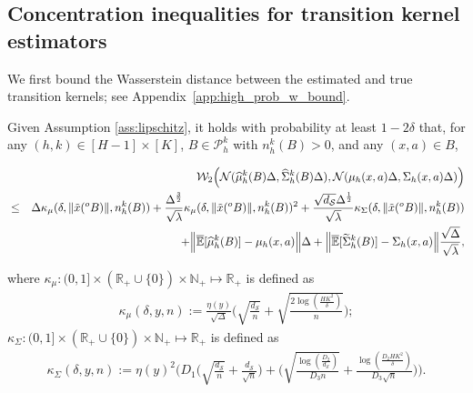 \documentclass[final,supplement]{siamart251216}
\newcommand{\NN}{\mathcal{N}}
\begin{document}
\subsection{Concentration inequalities for transition kernel estimators}
We first bound the Wasserstein distance between the estimated and true transition kernels; see Appendix~\ref{app:high_prob_w_bound}.
\begin{theorem}\label{thm:high_prob_w_bound} Given Assumption \ref{ass:lipschitz}, it holds with probability at least $1-2\delta$ that, for any $ (h,k) \in [H-1]\times [K]$, $B \in \mathcal{P}_h^k$ with $n_h^k(B)>0$, and any $(x,a) \in B$,  

    \begin{eqnarray}
&&\mathcal{W}_{2}\Big(\NN(\widehat{\mu}_{h}^{k}(B)\Delta,\widehat{\Sigma}_{h}^{k}(B)\Delta),\NN(\mu_{h}(x,a)\Delta,\Sigma_{h}(x,a)\Delta)\Big) \nonumber\\
    &\leq& \Delta\kappa_{\mu}(\delta,\|\tilde{x}(^{o}B)\|,n_h^k(B))+ \frac{\Delta^{\frac{3}{2}}}{\sqrt{\lambda}}\kappa_{\mu}(\delta,\|\tilde{x}(^{o}B)\|,n_h^k(B))^{2}+\frac{\sqrt{d_{\mathcal{S}}}\Delta^{\frac{1}{2}}}{\sqrt{\lambda}}\kappa_{\Sigma}(\delta,\|\tilde{x}(^{o}B)\|,n_h^k(B))\nonumber\\
    &&\hspace{12mm}+
    \Big\|\overline{\mathbb{E}}[\widehat{\mu}_{h}^{k}(B)]-\mu_{h}(x,a)\Big\|\Delta+\Big\|\overline{\mathbb{E}}[\widetilde{\Sigma}_{h}^{k}(B)]-\Sigma_h(x,a)\Big\|\frac{\sqrt{\Delta}}{\sqrt{\lambda}},\label{eq:high_prob_w_bound}
   \end{eqnarray}

where  $\kappa_{\mu}:(0,1]\times (\mathbb{R}_+\cup\{0\})\times \mathbb{N}_+ \mapsto \mathbb{R}_+$ is defined as 
\begin{eqnarray*}
    \kappa_{\mu}(\delta,y,n) :=\frac{\eta(y)}{\sqrt{\Delta}}\Big(\sqrt{\frac{d_{\mathcal{S}}}{n}} + \sqrt{\frac{2\log(\frac{HK^2}{\delta})}{n}}\Big);
\end{eqnarray*}
$\kappa_{\Sigma}:(0,1]\times (\mathbb{R}_+\cup\{0\})\times \mathbb{N}_+ \mapsto \mathbb{R}_+$ is defined as 
\begin{eqnarray*}
    \kappa_{\Sigma}(\delta,y,n) :=\eta(y)^{2}\Bigg( D_1\Big( \sqrt{\frac{d_{\mathcal{S}}}{n}}+\frac{d_{\mathcal{S}}}{\sqrt{n}}\Big) +\Bigg( \sqrt{\frac{\log(\frac{D_2}{d_{\mathcal{S}}})}{D_3n}}+\frac{\log(\frac{D_2 HK^2}{\delta})}{D_3\sqrt{n}}\Bigg)\Bigg).
\end{eqnarray*}
\end{theorem}
\end{document}
